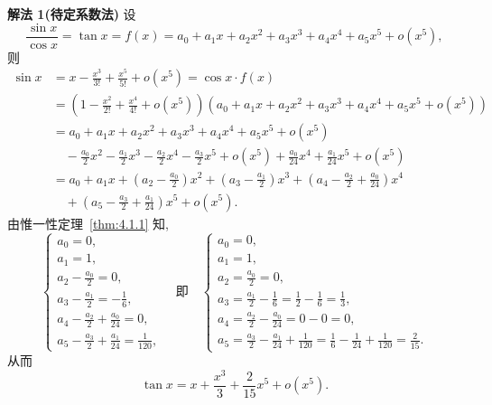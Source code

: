 \begin{solution}
\textbf{解法 1(待定系数法)} 设
\[
\frac{\sin x}{\cos x}=\tan x=f(x)=a_{0}+a_{1}x+a_{2}x^{2}+a_{3}x^{3}+a_{4}x^{4}+a_{5}x^{5}+o(x^{5}),
\]
则
\begin{align*}
\sin x&=x-\frac{x^{3}}{3!}+\frac{x^{5}}{5!}+o(x^{5})=\cos x\cdot f(x)\\
&=\left(1-\frac{x^{2}}{2!}+\frac{x^{4}}{4!}+o(x^{5})\right)(a_{0}+a_{1}x+a_{2}x^{2}+a_{3}x^{3}+a_{4}x^{4}+a_{5}x^{5}+o(x^{5}))\\
&=a_{0}+a_{1}x+a_{2}x^{2}+a_{3}x^{3}+a_{4}x^{4}+a_{5}x^{5}+o(x^{5})\\
&\quad-\frac{a_{0}}{2}x^{2}-\frac{a_{1}}{2}x^{3}-\frac{a_{2}}{2}x^{4}-\frac{a_{3}}{2}x^{5}+o(x^{5})+\frac{a_{0}}{24}x^{4}+\frac{a_{1}}{24}x^{5}+o(x^{5})\\
&=a_{0}+a_{1}x+\left(a_{2}-\frac{a_{0}}{2}\right)x^{2}+\left(a_{3}-\frac{a_{1}}{2}\right)x^{3}+\left(a_{4}-\frac{a_{2}}{2}+\frac{a_{0}}{24}\right)x^{4}\\
&\quad+\left(a_{5}-\frac{a_{3}}{2}+\frac{a_{1}}{24}\right)x^{5}+o(x^{5}).
\end{align*}
由惟一性定理~\ref{thm:4.1.1} 知,
\[
\begin{cases}
a_{0}=0,\\
a_{1}=1,\\
a_{2}-\frac{a_{0}}{2}=0,\\
a_{3}-\frac{a_{1}}{2}=-\frac{1}{6},\\
a_{4}-\frac{a_{2}}{2}+\frac{a_{0}}{24}=0,\\
a_{5}-\frac{a_{3}}{2}+\frac{a_{1}}{24}=\frac{1}{120},
\end{cases}\quad \text{即}\quad
\begin{cases}
a_{0}=0,\\
a_{1}=1,\\
a_{2}=\frac{a_{0}}{2}=0,\\
a_{3}=\frac{a_{1}}{2}-\frac{1}{6}=\frac{1}{2}-\frac{1}{6}=\frac{1}{3},\\
a_{4}=\frac{a_{2}}{2}-\frac{a_{0}}{24}=0-0=0,\\
a_{5}=\frac{a_{3}}{2}-\frac{a_{1}}{24}+\frac{1}{120}=\frac{1}{6}-\frac{1}{24}+\frac{1}{120}=\frac{2}{15}.
\end{cases}
\]
从而
\[
\tan x=x+\frac{x^{3}}{3}+\frac{2}{15}x^{5}+o(x^{5}).
\]


\end{solution}
